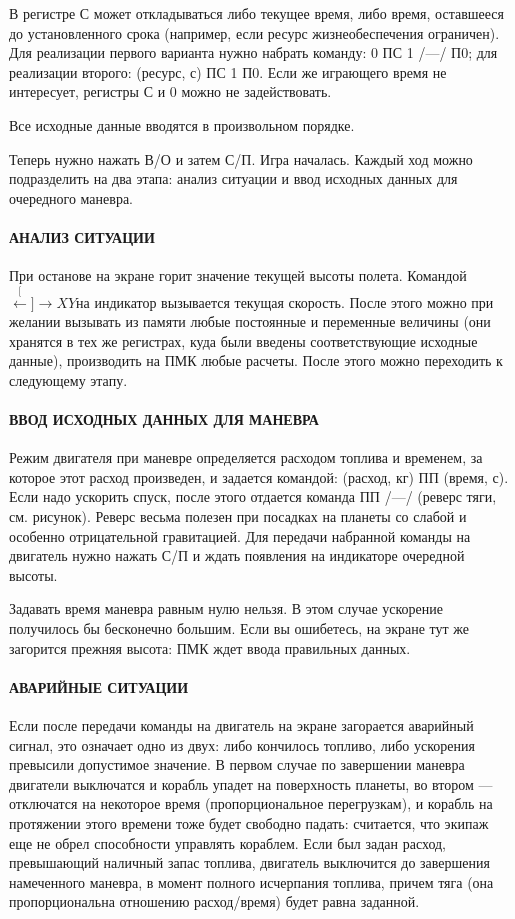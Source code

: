 \documentclass[11pt,a4paper,oneside]{article}
\def\XY{$\stackrel[\leftarrow]{\rightarrow}{XY}$}
\begin{document}
В регистре С может откладываться либо текущее время, либо время, оставшееся до установленного срока (например, если ресурс жизнеобеспечения ограничен). Для реализации первого варианта нужно набрать команду: 0 ПС 1 /—/ П0; для реализации второго: (ресурс, с) ПС 1 П0. Если же играющего время не интересует, регистры С и 0 можно не задействовать.

Все исходные данные вводятся в произвольном порядке.

Теперь нужно нажать В/О и затем С/П. Игра началась. Каждый ход можно подразделить на два этапа: анализ ситуации и ввод исходных данных для очередного маневра.

\paragraph{АНАЛИЗ СИТУАЦИИ}
При останове на экране горит значение текущей высоты полета. Командой \XY на индикатор вызывается текущая скорость. После этого можно при желании вызывать из памяти любые постоянные и переменные величины (они хранятся в тех же регистрах, куда были введены соответствующие исходные данные), производить на ПМК любые расчеты. После этого можно переходить к следующему этапу.

\paragraph{ВВОД ИСХОДНЫХ ДАННЫХ ДЛЯ МАНЕВРА}

Режим двигателя при маневре определяется расходом топлива и временем, за которое этот расход произведен, и задается командой: (расход, кг) ПП (время, с). Если надо ускорить спуск, после этого отдается команда ПП /—/ (реверс тяги, см. рисунок). Реверс весьма полезен при посадках на планеты со слабой и особенно отрицательной гравитацией. Для передачи набранной команды на двигатель нужно нажать С/П и ждать появления на индикаторе очередной высоты.

Задавать время маневра равным нулю нельзя. В этом случае ускорение получилось бы бесконечно большим. Если вы ошибетесь, на экране тут же загорится прежняя высота: ПМК ждет ввода правильных данных.

\paragraph{АВАРИЙНЫЕ СИТУАЦИИ}

Если после передачи команды на двигатель на экране загорается аварийный сигнал, это означает одно из двух: либо кончилось топливо, либо ускорения превысили допустимое значение. В первом случае по завершении маневра двигатели выключатся и корабль упадет на поверхность планеты, во втором — отключатся на некоторое время (пропорциональное перегрузкам), и корабль на протяжении этого времени тоже будет свободно падать: считается, что экипаж еще не обрел способности управлять кораблем. Если был задан расход, превышающий наличный запас топлива, двигатель выключится до завершения намеченного маневра, в момент полного исчерпания топлива, причем тяга (она пропорциональна отношению расход/время) будет равна заданной.
\end{document}
